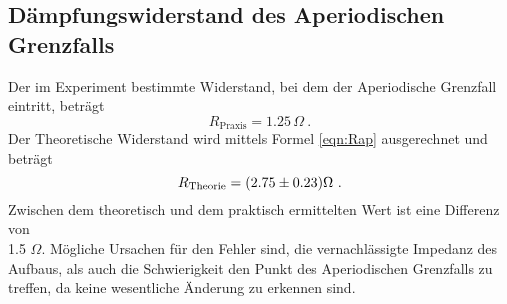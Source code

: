 \subsection{Dämpfungswiderstand des Aperiodischen Grenzfalls}
Der im Experiment bestimmte Widerstand, bei dem der Aperiodische Grenzfall eintritt, beträgt
\begin{equation}
  R_\text{Praxis} = 1.25 \, \Omega \ .
  \label{eqn:Rprax}
\end{equation}
Der Theoretische Widerstand wird mittels Formel \ref{eqn:Rap} ausgerechnet und beträgt
\begin{equation}
  R_\text{Theorie} = (\num{2.75 +- 0.23}) \Omega \ .
  \label{eqn:Rthe}
\end{equation}
Zwischen dem theoretisch und dem praktisch ermittelten Wert ist eine Differenz von \\
1.5 $\Omega$. Mögliche Ursachen für den Fehler sind, die vernachlässigte Impedanz des Aufbaus, als auch die Schwierigkeit den Punkt des Aperiodischen Grenzfalls zu treffen, da keine wesentliche Änderung zu erkennen sind.
